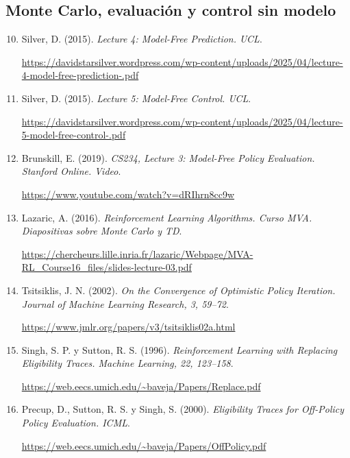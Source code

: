 \documentclass[11pt,a4paper]{article}
\newcommand{\fuente}[4]{\item\label{#1} #2. \textit{#3}.\par{\small\raggedright\url{#4}\par}}
\begin{document}
\subsection*{Monte Carlo, evaluación y control sin modelo}
\begin{enumerate}
\setcounter{enumi}{9}
\renewcommand{\labelenumi}{[\arabic{enumi}]}
\setlength{\itemsep}{0.7em}
\fuente{f:silvermc}{Silver, D. (2015)}{Lecture 4: Model-Free Prediction. UCL}{https://davidstarsilver.wordpress.com/wp-content/uploads/2025/04/lecture-4-model-free-prediction-.pdf}
\fuente{f:silvercontrol}{Silver, D. (2015)}{Lecture 5: Model-Free Control. UCL}{https://davidstarsilver.wordpress.com/wp-content/uploads/2025/04/lecture-5-model-free-control-.pdf}
\fuente{f:brunskill}{Brunskill, E. (2019)}{CS234, Lecture 3: Model-Free Policy Evaluation. Stanford Online. Video}{https://www.youtube.com/watch?v=dRIhrn8cc9w}
\fuente{f:lazaric}{Lazaric, A. (2016)}{Reinforcement Learning Algorithms. Curso MVA. Diapositivas sobre Monte Carlo y TD}{https://chercheurs.lille.inria.fr/lazaric/Webpage/MVA-RL_Course16_files/slides-lecture-03.pdf}
\fuente{f:tsitsiklisopi}{Tsitsiklis, J. N. (2002)}{On the Convergence of Optimistic Policy Iteration. Journal of Machine Learning Research, 3, 59--72}{https://www.jmlr.org/papers/v3/tsitsiklis02a.html}
\fuente{f:singh}{Singh, S. P. y Sutton, R. S. (1996)}{Reinforcement Learning with Replacing Eligibility Traces. Machine Learning, 22, 123--158}{https://web.eecs.umich.edu/~baveja/Papers/Replace.pdf}
\fuente{f:precup}{Precup, D., Sutton, R. S. y Singh, S. (2000)}{Eligibility Traces for Off-Policy Policy Evaluation. ICML}{https://web.eecs.umich.edu/~baveja/Papers/OffPolicy.pdf}
\end{enumerate}
\end{document}
